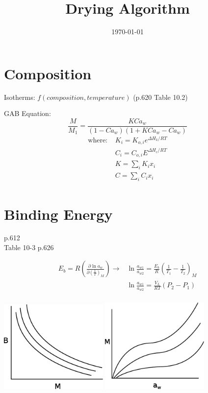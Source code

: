 \documentclass[11pt]{article}
\begin{document}
\title{Drying Algorithm}
\date{\today}
\maketitle

\section{Composition}
Isotherms: $f(composition, temperature)$ (p.620 Table 10.2)

GAB Equation:
\[ \frac{M}{M_1} = \frac{K C a_w}{(1-C a_w)(1 + K C a_w - C a_w)} \]
\begin{align*}
\text{where: }& K_i = K_{o,i} e^{\Delta H_k/RT}\\
&C_i = C_{o,i} E^{\Delta H_c/RT}\\
&K = \sum_i K_i x_i\\
&C = \sum_i C_i x_i\\
\end{align*}

\section{Binding Energy}
p.612\\
Table 10-3 p.626

\begin{align*}
E_b = R\left(\frac{\partial\ln a_w}{\partial\left(\frac{1}{T}\right)_M}\right) \rightarrow &\ln\frac{a_{w1}}{a_{w2}} = \frac{E_b}{R}\left(\frac{1}{T_1}-\frac{1}{T_2}\right)_M \\
& \ln\frac{a_{w1}}{a_{w2}} = \frac{V_L}{RT}(P_2-P_1) \\
\end{align*}

\begin{center}
\includegraphics[width=0.4\textwidth]{pics/eps/binding_energy_1}
\includegraphics[width=0.4\textwidth]{pics/eps/binding_energy_2}
\end{center}
\end{document}
